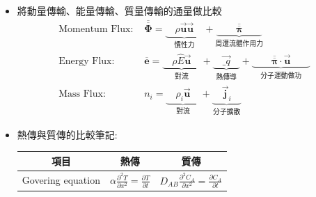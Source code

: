 \documentclass[../main.tex]{subfiles}
\begin{document}
\begin{itemize}
\begin{enumerate}
\begin{equation}
        \sum_i \vec{\bm J}_i \neq 0
      \end{equation}
      為了使得$\sum_i \vec{\bm J}_i = 0$，因此需要
      \item Molar Average Velocity, $\vec{\bm u}^\ast$
        因為$\sum_i \vec{\bm J}_i \neq 0$，因此定義新的$\vec{\bm u}^\ast$
        \begin{equation}
          \boxed{C \vec{\bm u}^\ast = \sum_i C_i \vec{\bm u}_i \implies \vec{\bm u}^\ast = \frac{\sum_i C_i \vec{\bm u}_i}{C} }
          \label{eq:molar_flux_decomposition_volume_average}
        \end{equation}
        能使得:
        \begin{equation}
          \sum_i \vec{\bm J}_i = 0
        \end{equation}
        且
        \begin{equation}
          \vec{\bm J}_i = C_i \left(\vec{\bm u}_i - \vec{\bm u}^\ast\right)
        \end{equation}
    \end{enumerate}
\item 將動量傳輸、能量傳輸、質量傳輸的通量做比較
\begin{align}
  \text{Momentum Flux: }& \overline{\overline {\bm \Phi}} = \underbrace{\quad\rho \vec{\bm u}\vec{\bm u}\quad}_{\text{慣性力}} 
  + \underbrace{\quad\quad\overline{\overline{\bm \pi}}\quad\quad}_{\text{周遭流體作用力}} \nonumber\\
  \text{Energy Flux: }& \overline{\bm e}  = \underbrace{\quad\rho\hat E \vec{\bm u} \quad}_{\text{對流}}
  + \underbrace{\quad\vec{\bm_q}\quad}_{\text{熱傳導}} 
  + \underbrace{\quad\quad\overline{\overline{\bm \pi}}\cdot \vec{\bm u}\quad\quad}_{\text{分子運動做功}} \nonumber\\
  \text{Mass Flux: }& n_i = \underbrace{\quad\rho_i \vec{\bm u}\quad}_{\text{對流}}
  + \underbrace{\quad\vec{\bm j}_i\quad}_{\text{分子擴散}} \label{eq:transport_flux_comparison}
\end{align}
\item 熱傳與質傳的比較筆記:
\renewcommand{\arraystretch}{1.5}
\begin{table}[H]
  \centering
  \begin{tabular}{|c|c|c|}
    \hline
    項目 & 熱傳 & 質傳 \\
    \hline
    Govering equation &
    $\alpha \frac{\partial^2 T}{\partial x^2}= \frac{\partial T}{\partial t}$ &
    $D_{AB} \frac{\partial^2 C_A}{\partial x^2} = \frac{\partial C_A}{\partial t}$ \\

\end{tabular}
\end{table}
\end{itemize}
\end{document}
